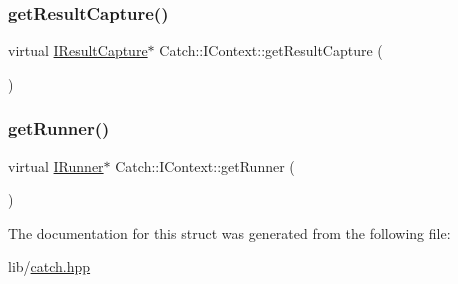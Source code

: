 \subsubsection{\texorpdfstring{get\+Result\+Capture()}{getResultCapture()}}
{\footnotesize\ttfamily virtual \hyperlink{struct_catch_1_1_i_result_capture}{I\+Result\+Capture}$\ast$ Catch\+::\+I\+Context\+::get\+Result\+Capture (\begin{DoxyParamCaption}{ }\end{DoxyParamCaption})\hspace{0.3cm}{\ttfamily [pure virtual]}}

\hypertarget{struct_catch_1_1_i_context_af088415dde18d039ed5a2f95b02767c6}{}\label{struct_catch_1_1_i_context_af088415dde18d039ed5a2f95b02767c6} 
\subsubsection{\texorpdfstring{get\+Runner()}{getRunner()}}
{\footnotesize\ttfamily virtual \hyperlink{struct_catch_1_1_i_runner}{I\+Runner}$\ast$ Catch\+::\+I\+Context\+::get\+Runner (\begin{DoxyParamCaption}{ }\end{DoxyParamCaption})\hspace{0.3cm}{\ttfamily [pure virtual]}}



The documentation for this struct was generated from the following file\+:\begin{DoxyCompactItemize}
\item 
lib/\hyperlink{catch_8hpp}{catch.\+hpp}\end{DoxyCompactItemize}
